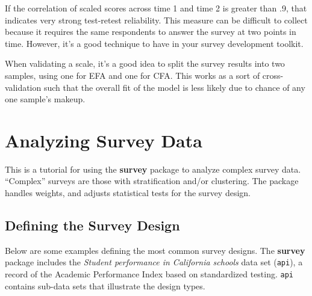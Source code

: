 \documentclass[
]{book}
\newenvironment{Shaded}{\begin{snugshade}}{\end{snugshade}}
\newcommand{\CommentTok}[1]{\textcolor[rgb]{0.56,0.35,0.01}{\textit{#1}}}
\theoremstyle{definition}
\theoremstyle{definition}
\theoremstyle{definition}
\theoremstyle{definition}
\theoremstyle{remark}
\begin{document}
If the correlation of scaled scores across time 1 and time 2 is greater than .9, that indicates very strong test-retest reliability. This measure can be difficult to collect because it requires the same respondents to answer the survey at two points in time. However, it's a good technique to have in your survey development toolkit.

When validating a scale, it's a good idea to split the survey results into two samples, using one for EFA and one for CFA. This works as a sort of cross-validation such that the overall fit of the model is less likely due to chance of any one sample's makeup.

\begin{Shaded}
\end{Shaded}

\hypertarget{analyzing-survey-data}{%
\chapter{Analyzing Survey Data}\label{analyzing-survey-data}}

This is a tutorial for using the \textbf{survey} package \citep{R-survey} to analyze complex survey data. ``Complex'' surveys are those with stratification and/or clustering. The package handles weights, and adjusts statistical tests for the survey design.

\hypertarget{defining-the-survey-design}{%
\section{Defining the Survey Design}\label{defining-the-survey-design}}

Below are some examples defining the most common survey designs. The \textbf{survey} package includes the \emph{Student performance in California schools} data set (\texttt{api}), a record of the Academic Performance Index based on standardized testing. \texttt{api} contains sub-data sets that illustrate the design types.
\end{document}
